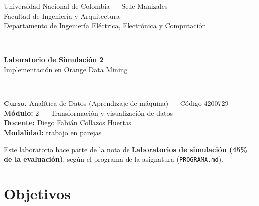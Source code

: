\documentclass[11pt,letterpaper]{article}
\title{\vspace{-2cm}}
\date{}
\begin{document}
\begin{titlepage}
\centering
\vspace*{1.5cm}

{\Large Universidad Nacional de Colombia --- Sede Manizales}\\[0.2cm]
{\large Facultad de Ingeniería y Arquitectura}\\[0.2cm]
{\large Departamento de Ingeniería Eléctrica, Electrónica y Computación}\\[1.2cm]

\rule{\linewidth}{1pt}\\[0.5cm]
{\huge\bfseries\color{brandblue} Laboratorio de Simulación 2}\\[0.4cm]
{\Large Implementación en Orange Data Mining}\\[0.5cm]
\rule{\linewidth}{1pt}\\[1cm]

{\large \textbf{Curso:} Analítica de Datos (Aprendizaje de máquina) --- Código 4200729}\\[0.3cm]
{\large \textbf{Módulo:} 2 --- Transformación y visualización de datos}\\[0.3cm]
{\large \textbf{Docente:} Diego Fabián Collazos Huertas}\\[0.3cm]
{\large \textbf{Modalidad:} trabajo en parejas}\\[1.5cm]

\vfill

{\small Este laboratorio hace parte de la nota de \textbf{Laboratorios de simulación (45\% de la evaluación)}, según el programa de la asignatura (\texttt{PROGRAMA.md}).}

\end{titlepage}

\section{Objetivos}
\end{document}
